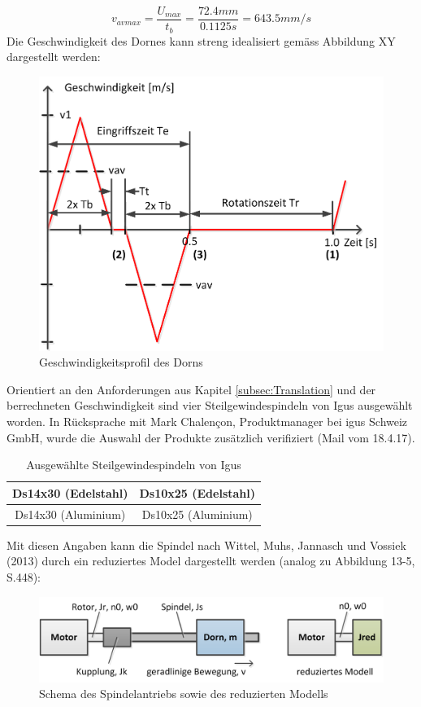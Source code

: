 \begin{equation}
v_{avmax}=\frac{U_{max}}{t_{b}}=\frac{72.4mm}{0.1125s}=643.5mm/s
\end{equation}
\newline
Die Geschwindigkeit des Dornes kann streng idealisiert gemäss Abbildung XY dargestellt werden:
	\begin{figure}[H]
	\includegraphics[width=1\textwidth]{Illustrationen/6-Umsetzung/vprofil_dorn.png}
	\caption{Geschwindigkeitsprofil des Dorns}
	\label{fig:vprofil_dorn}
\end{figure}
Orientiert an den Anforderungen aus Kapitel \ref{subsec:Translation} und der berrechneten Geschwindigkeit sind vier Steilgewindespindeln von Igus ausgewählt worden. In Rücksprache mit Mark Chalençon, Produktmanager bei igus Schweiz GmbH, wurde die Auswahl der Produkte zusätzlich verifiziert (Mail vom 18.4.17).
\begin{table}[H]
\begin{tabular}{|c|c|}
	\hline 
	Ds14x30 (Edelstahl) & Ds10x25 (Edelstahl) \\ 
	\hline 
	Ds14x30 (Aluminium) & Ds10x25 (Aluminium) \\ 
	\hline 
\end{tabular} 
\caption{Ausgewählte Steilgewindespindeln von Igus}
\label{tab:spindeln}
\end{table}
Mit diesen Angaben kann die Spindel nach Wittel, Muhs, Jannasch und Vossiek (2013) durch ein reduziertes Model dargestellt werden (analog zu Abbildung 13-5, S.448):
 	\begin{figure}[H]
 	\includegraphics[width=1\textwidth]{Illustrationen/6-Umsetzung/red_modell.png}
 	\caption{Schema des Spindelantriebs sowie des reduzierten Modells}
 	\label{fig:red_modell}
	\end{figure}
